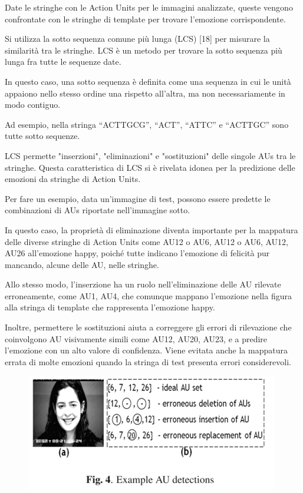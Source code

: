 Date le stringhe con le Action Units per le immagini analizzate, queste vengono confrontate con le stringhe di template per trovare l'emozione corrispondente. 

Si utilizza la sotto sequenza comune più lunga (LCS) [18] per misurare la similarità tra le stringhe. LCS è un metodo per trovare la sotto sequenza più lunga fra tutte le sequenze date. 

In questo caso, una sotto sequenza è definita come una sequenza in cui le unità appaiono nello stesso ordine una rispetto all’altra, ma non necessariamente in modo contiguo. 

Ad esempio, nella stringa “ACTTGCG”, “ACT”, “ATTC” e “ACTTGC” sono tutte sotto sequenze. 

LCS permette "inserzioni", "eliminazioni" e "sostituzioni" delle singole AUs tra le stringhe. Questa caratteristica di LCS si è rivelata idonea per la predizione delle emozioni da stringhe di Action Units.

Per fare un esempio, data un'immagine di test, possono essere predette le combinazioni di AUs riportate nell’immagine sotto.

In questo caso, la proprietà di eliminazione diventa importante per la mappatura delle diverse stringhe di Action Units come {AU12} o {AU6, AU12} o {AU6, AU12, AU26} all'emozione happy, poiché tutte indicano l’emozione di felicità pur mancando, alcune delle AU, nelle stringhe. 

Allo stesso modo, l'inserzione ha un ruolo nell’eliminazione delle AU rilevate erroneamente, come {AU1, AU4}, che comunque mappano l'emozione nella figura alla stringa di template che rappresenta l’emozione happy. 

Inoltre, permettere le sostituzioni aiuta a correggere gli errori di rilevazione che coinvolgono AU visivamente simili come AU12, AU20, AU23, e a predire l'emozione con un alto valore di confidenza. Viene evitata anche la mappatura errata di molte emozioni quando la stringa di test presenta errori considerevoli.
\begin{figure}
    \begin{center}    
        \includegraphics[width=1\linewidth]{images/21.png}
    \end{center}
\end{figure}

